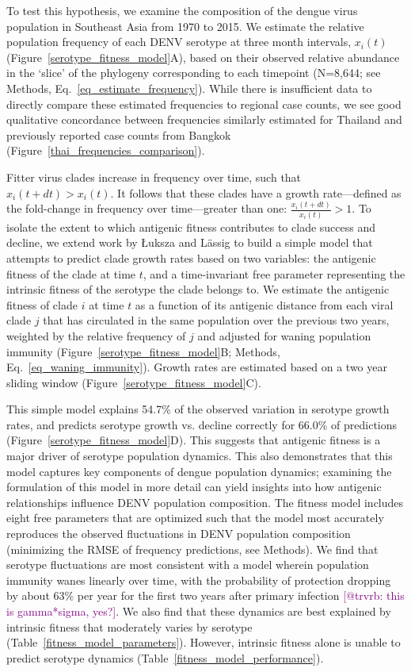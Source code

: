\documentclass[11pt,oneside,letterpaper]{article}
\def\sbc#1{\textcolor{purple}{[#1]}}
\begin{document}
To test this hypothesis, we examine the composition of the dengue virus population in Southeast Asia from 1970 to 2015.
We estimate the relative population frequency of each DENV serotype at three month intervals, $x_i(t)$ (Figure~\ref{serotype_fitness_model}A), based on their observed relative abundance in the `slice' of the phylogeny corresponding to each timepoint (N=8,644; see Methods, Eq.~\ref{eq_estimate_frequency}).
While there is insufficient data to directly compare these estimated frequencies to regional case counts, we see good qualitative concordance between frequencies similarly estimated for Thailand and previously reported case counts from Bangkok (Figure~\ref{thai_frequencies_comparison}).

Fitter virus clades increase in frequency over time, such that $x_i(t+dt) > x_i(t)$.
It follows that these clades have a growth rate---defined as the fold-change in frequency over time---greater than one: $\frac{x_i(t+dt)}{x_i(t)} > 1$.
To isolate the extent to which antigenic fitness contributes to clade success and decline, we extend work by {\L}uksza and L\"assig  \citep{luksza2014predictive} to build a simple model that attempts to predict clade growth rates based on two variables: the antigenic fitness of the clade at time $t$, and a time-invariant free parameter representing the intrinsic fitness of the serotype the clade belongs to.
We estimate the antigenic fitness of clade $i$ at time $t$ as a function of its antigenic distance from each viral clade $j$ that has circulated in the same population over the previous two years, weighted by the relative frequency of $j$ and adjusted for waning population immunity (Figure~\ref{serotype_fitness_model}B; Methods, Eq.~\ref{eq_waning_immunity}).
Growth rates are estimated based on a two year sliding window (Figure~\ref{serotype_fitness_model}C).

This simple model explains 54.7\% of the observed variation in serotype growth rates, and predicts serotype growth vs. decline correctly for 66.0\% of predictions (Figure~\ref{serotype_fitness_model}D).
This suggests that antigenic fitness is a major driver of serotype population dynamics.
This also demonstrates that this model captures key components of dengue population dynamics; examining the formulation of this model in more detail can yield insights into how antigenic relationships influence DENV population composition.
The fitness model includes eight free parameters that are optimized such that the model most accurately reproduces the observed fluctuations in DENV population composition (minimizing the RMSE of frequency predictions, see Methods).
We find that serotype fluctuations are most consistent with a model wherein population immunity wanes linearly over time, with the probability of protection dropping by about 63\% per year for the first two years after primary infection \sbc{@trvrb: this is gamma*sigma, yes?}.
We also find that these dynamics are best explained by intrinsic fitness that moderately varies by serotype (Table~\ref{fitness_model_parameters}).
However, intrinsic fitness alone is unable to predict serotype dynamics (Table~\ref{fitness_model_performance}).
\end{document}
